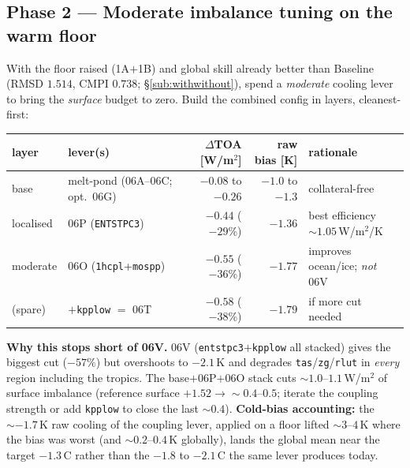 \documentclass[10pt]{article}
\begin{document}
\subsection{Phase 2 --- Moderate imbalance tuning on the warm floor}
With the floor raised (1A$+$1B) and global skill already better than Baseline (RMSD $1.514$, CMPI $0.738$;
\S\ref{sub:withwithout}), spend a \emph{moderate} cooling lever to bring the \emph{surface} budget to zero. Build the
combined config in layers, cleanest-first:
\begin{center}\small
\begin{tabular}{l l r r l}
\toprule
layer & lever(s) & $\Delta$TOA [W/m$^2$] & raw bias [K] & rationale \\
\midrule
base      & melt-pond (06A--06C; opt.\ 06G) & $-0.08$ to $-0.26$ & $-1.0$ to $-1.3$ & collateral-free \\
localised & 06P (\texttt{ENTSTPC3})         & $-0.44$ ($-29\%$)  & $-1.36$ & best efficiency $\sim1.05$\,W/m$^2$/K \\
moderate  & 06O (\texttt{1hcpl}+\texttt{mospp}) & $-0.55$ ($-36\%$) & $-1.77$ & improves ocean/ice; \emph{not} 06V \\
\midrule
(spare)   & $+$\texttt{kpplow} $=$ 06T      & $-0.58$ ($-38\%$)  & $-1.79$ & if more cut needed \\
\bottomrule
\end{tabular}
\end{center}
\textbf{Why this stops short of 06V.} 06V (\texttt{entstpc3}$+$\texttt{kpplow} all stacked) gives the biggest cut
($-57\%$) but overshoots to $-2.1$\,K and degrades \texttt{tas}/\texttt{zg}/\texttt{rlut} in \emph{every} region
including the tropics. The base$+$06P$+$06O stack cuts $\sim1.0$--$1.1$\,W/m$^2$ of surface imbalance (reference
surface $+1.52\to\sim0.4$--$0.5$; iterate the coupling strength or add \texttt{kpplow} to close the last $\sim0.4$).
\textbf{Cold-bias accounting:} the $\sim-1.7$\,K raw cooling of the coupling lever, applied on a floor lifted
$\sim3$--$4$\,K where the bias was worst (and $\sim0.2$--$0.4$\,K globally), lands the global mean near the target
$-1.3$\,\textdegree C rather than the $-1.8$ to $-2.1$\,\textdegree C the same lever produces today.
\end{document}
